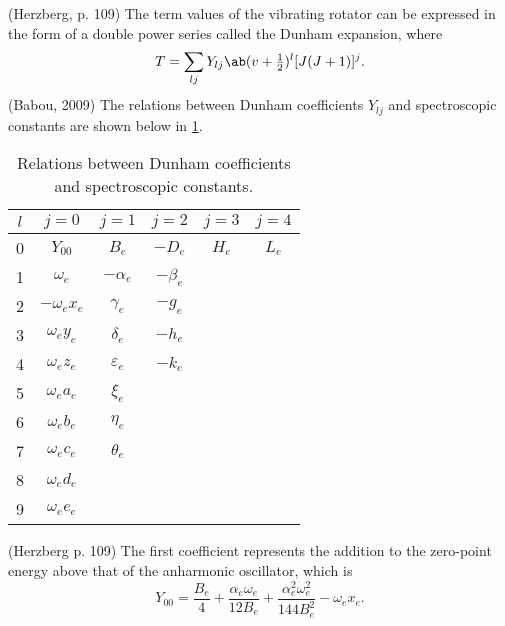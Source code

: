 \documentclass[11pt, twoside, fleqn]{report}
\begin{document}
 (Herzberg, p. 109)
The term values of the vibrating rotator can be expressed in the form of a double power series called the Dunham expansion, where
\begin{equation*}
    T = \sum_{lj}Y_{lj}\ab(v + \tfrac{1}{2})^{l} [J(J + 1)]^{j}.
\end{equation*}
(Babou, 2009)
The relations between Dunham coefficients $Y_{lj}$ and spectroscopic constants are shown below in \cref{t:dunham_coefficients}.
\begin{table}[H]
    \centering
    \caption{Relations between Dunham coefficients and spectroscopic constants.}
    \label{t:dunham_coefficients}
    \begin{tabular}{c|ccccc}
        \toprule
        $l$ & $j = 0$            & $j = 1$           & $j = 2$      & $j = 3$ & $j = 4$ \\
        \midrule
        0   & $Y_{00}$           & $B_{e}$           & $-D_{e}$     & $H_{e}$ & $L_{e}$ \\
        1   & $\omega_{e}$       & $-\alpha_{e}$     & $-\beta_{e}$ &         &         \\
        2   & $-\omega_{e}x_{e}$ & $\gamma_{e}$      & $-g_{e}$     &         &         \\
        3   & $\omega_{e}y_{e}$  & $\delta_{e}$      & $-h_{e}$     &         &         \\
        4   & $\omega_{e}z_{e}$  & $\varepsilon_{e}$ & $-k_{e}$     &         &         \\
        5   & $\omega_{e}a_{e}$  & $\xi_{e}$         &              &         &         \\
        6   & $\omega_{e}b_{e}$  & $\eta_{e}$        &              &         &         \\
        7   & $\omega_{e}c_{e}$  & $\theta_{e}$      &              &         &         \\
        8   & $\omega_{e}d_{e}$  &                   &              &         &         \\
        9   & $\omega_{e}e_{e}$  &                   &              &         &         \\
        \bottomrule
    \end{tabular}
\end{table}
(Herzberg p. 109)
The first coefficient represents the addition to the zero-point energy above that of the anharmonic oscillator, which is
\begin{equation*}
    Y_{00} = \frac{B_{e}}{4} + \frac{\alpha_{e}\omega_{e}}{12B_{e}} + \frac{\alpha_{e}^{2}\omega_{e}^{2}}{144B_{e}^{2}} - \omega_{e}x_{e}.
\end{equation*}
\end{document}

